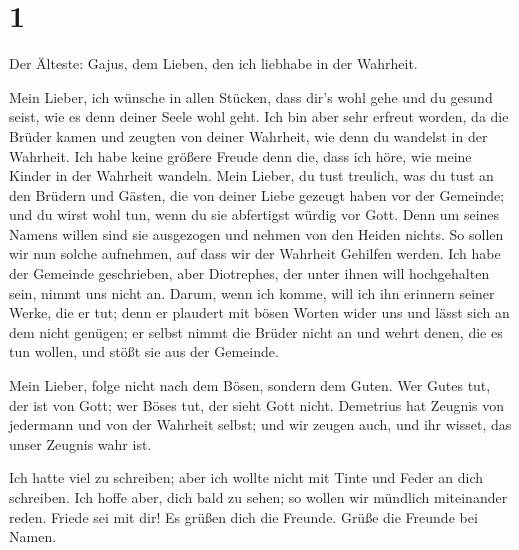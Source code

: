 \hypertarget{section}{%
\section{1}\label{section}}

 Der Älteste: Gajus, dem Lieben, den ich liebhabe in der
Wahrheit.

 Mein Lieber, ich wünsche in allen Stücken, dass dir's
wohl gehe und du gesund seist, wie es denn deiner Seele wohl geht.
 Ich bin aber sehr erfreut worden, da die Brüder kamen und
zeugten von deiner Wahrheit, wie denn du wandelst in der Wahrheit.
 Ich habe keine größere Freude denn die, dass ich höre,
wie meine Kinder in der Wahrheit wandeln.  Mein Lieber, du
tust treulich, was du tust an den Brüdern und Gästen,  die
von deiner Liebe gezeugt haben vor der Gemeinde; und du wirst wohl tun,
wenn du sie abfertigst würdig vor Gott.  Denn um seines
Namens willen sind sie ausgezogen und nehmen von den Heiden nichts.
 So sollen wir nun solche aufnehmen, auf dass wir der
Wahrheit Gehilfen werden.  Ich habe der Gemeinde
geschrieben, aber Diotrephes, der unter ihnen will hochgehalten sein,
nimmt uns nicht an.  Darum, wenn ich komme, will ich ihn
erinnern seiner Werke, die er tut; denn er plaudert mit bösen Worten
wider uns und lässt sich an dem nicht genügen; er selbst nimmt die
Brüder nicht an und wehrt denen, die es tun wollen, und stößt sie aus
der Gemeinde.

 Mein Lieber, folge nicht nach dem Bösen, sondern dem
Guten. Wer Gutes tut, der ist von Gott; wer Böses tut, der sieht Gott
nicht.  Demetrius hat Zeugnis von jedermann und von der
Wahrheit selbst; und wir zeugen auch, und ihr wisset, das unser Zeugnis
wahr ist.

 Ich hatte viel zu schreiben; aber ich wollte nicht mit
Tinte und Feder an dich schreiben.  Ich hoffe aber, dich
bald zu sehen; so wollen wir mündlich miteinander reden. 
Friede sei mit dir! Es grüßen dich die Freunde. Grüße die Freunde bei
Namen.
